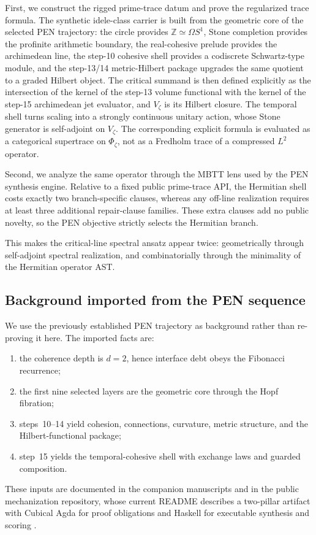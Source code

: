 \documentclass[11pt,a4paper]{article}
\theoremstyle{plain}
\theoremstyle{definition}
\newcommand{\Z}{\mathbb{Z}}
\begin{document}
First, we construct the rigged prime-trace datum and prove the regularized trace formula. The synthetic idele-class carrier is built from the geometric core of the selected PEN trajectory: the circle provides $\Z\simeq \Omega S^1$, Stone completion provides the profinite arithmetic boundary, the real-cohesive prelude provides the archimedean line, the step-10 cohesive shell provides a codiscrete Schwartz-type module, and the step-13/14 metric-Hilbert package upgrades the same quotient to a graded Hilbert object. The critical summand is then defined explicitly as the intersection of the kernel of the step-13 volume functional with the kernel of the step-15 archimedean jet evaluator, and $V_{\zeta}$ is its Hilbert closure. The temporal shell turns scaling into a strongly continuous unitary action, whose Stone generator is self-adjoint on $V_{\zeta}$. The corresponding explicit formula is evaluated as a categorical supertrace on $\Phi_{\zeta}$, not as a Fredholm trace of a compressed $L^2$ operator.

Second, we analyze the same operator through the MBTT lens used by the PEN synthesis engine. Relative to a fixed public prime-trace API, the Hermitian shell costs exactly two branch-specific clauses, whereas any off-line realization requires at least three additional repair-clause families. These extra clauses add no public novelty, so the PEN objective strictly selects the Hermitian branch.

This makes the critical-line spectral ansatz appear twice: geometrically through self-adjoint spectral realization, and combinatorially through the minimality of the Hermitian operator AST.

\subsection{Background imported from the PEN sequence}

We use the previously established PEN trajectory as background rather than re-proving it here. The imported facts are:
\begin{enumerate}[nosep]
  \item the coherence depth is $d=2$, hence interface debt obeys the Fibonacci recurrence;
  \item the first nine selected layers are the geometric core through the Hopf fibration;
  \item steps~10--14 yield cohesion, connections, curvature, metric structure, and the Hilbert-functional package;
  \item step~15 yields the temporal-cohesive shell with exchange laws and guarded composition.
\end{enumerate}
These inputs are documented in the companion manuscripts and in the public mechanization repository, whose current README describes a two-pillar artifact with Cubical Agda for proof obligations and Haskell for executable synthesis and scoring \citep{lande-coherence,lande-generative,lande-framework,lande-repo,lande-arch}.
\end{document}
